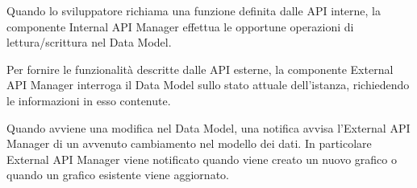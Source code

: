 
			Quando lo sviluppatore richiama una funzione definita dalle API interne, la componente Internal API Manager effettua le opportune operazioni di lettura/scrittura nel Data Model.

			Per fornire le funzionalità descritte dalle API esterne, la componente External API Manager interroga il Data Model sullo stato attuale dell'istanza, richiedendo le informazioni in esso contenute.

			Quando avviene una modifica nel Data Model, una notifica avvisa l'External API Manager di un avvenuto cambiamento nel modello dei dati. In particolare External API Manager viene notificato quando viene creato un nuovo grafico o quando un grafico esistente viene aggiornato.
